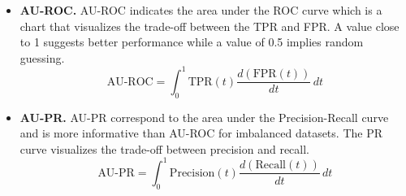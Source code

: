 \begin{itemize}
    \begin{equation}\label{eq:fpr}
        \text{FPR} = \frac{\text{FP}}{\text{FP} + \text{TN}}
    \end{equation}
    \item \textbf{AU-ROC.} \ac{AU-ROC} indicates the area under the ROC curve which is a chart that visualizes the trade-off between the TPR and FPR. A value close to 1 suggests better performance while a value of 0.5 implies random guessing.
    \begin{equation}\label{eq:auroc}
        \text{AU-ROC} = \int_{0}^{1} \text{TPR}(t) \frac{d(\text{FPR}(t))}{dt} \,dt
    \end{equation}
    \item \textbf{AU-PR.} \ac{AU-PR} correspond to the area under the Precision-Recall curve and is more informative than AU-ROC for imbalanced datasets. The PR curve visualizes the trade-off between precision and recall.
    \begin{equation}\label{eq:aupr}
        \text{AU-PR} = \int_{0}^{1} \text{Precision}(t) \frac{d(\text{Recall}(t))}{dt} \,dt
    \end{equation}
\end{itemize}



